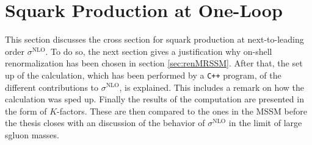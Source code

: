 \section{Squark Production at One-Loop}
This section discusses the cross section for squark production at next-to-leading order $\sigma^{\mathrm{NLO}}$. To do so, the next section gives a justification why on-shell renormalization has been chosen in section \ref{sec:renMRSSM}. After that, the set up of the calculation, which has been performed by a \texttt{C++} program,  of the different contributions to $\sigma^{\mathrm{NLO}}$, is explained. This includes a remark on how the calculation was sped up. Finally the results of the computation are presented in the form of $K$-factors. These are then compared to the ones in the MSSM before the thesis closes with an discussion of the behavior of $\sigma^{\mathrm{NLO}}$ in the limit of large sgluon masses.

